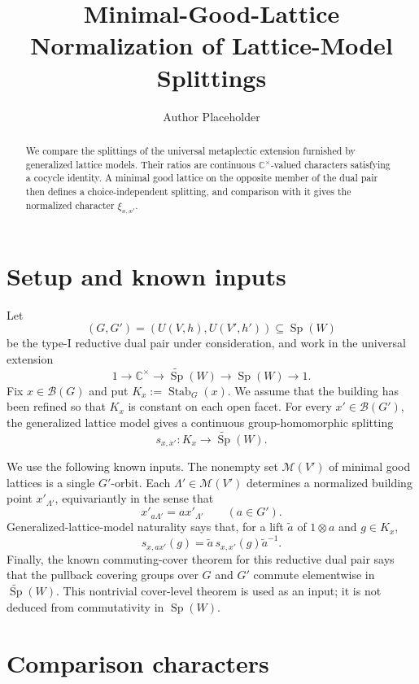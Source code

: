 \documentclass[11pt]{amsart}
\title{Minimal-Good-Lattice Normalization of Lattice-Model Splittings}
\author{Author Placeholder}
\date{}
\DeclareMathOperator{\Sp}{Sp}
\DeclareMathOperator{\Stab}{Stab}
\theoremstyle{remark}
\begin{document}
\begin{abstract}
We compare the splittings of the universal metaplectic extension furnished by
generalized lattice models. Their ratios are continuous
$\mathbb C^\times$-valued characters satisfying a cocycle identity. A minimal
good lattice on the opposite member of the dual pair then defines a
choice-independent splitting, and comparison with it gives the normalized
character $\xi_{x,x'}$.
\end{abstract}

\maketitle

\section{Setup and known inputs}

Let
\[
(G,G')=(U(V,h),U(V',h'))\subseteq \Sp(W)
\]
be the type-I reductive dual pair under consideration, and work in the
universal extension
\[
1\longrightarrow \mathbb C^\times
\longrightarrow \widetilde{\Sp}(W)
\longrightarrow \Sp(W)
\longrightarrow 1.
\]
Fix $x\in\mathcal B(G)$ and put $K_x:=\Stab_G(x)$. We assume that the
building has been refined so that $K_x$ is constant on each open facet. For
every $x'\in\mathcal B(G')$, the generalized lattice model gives a continuous
group-homomorphic splitting
\[
s_{x,x'}\colon K_x\longrightarrow\widetilde{\Sp}(W).
\]

We use the following known inputs. The nonempty set $\mathscr M(V')$ of
minimal good lattices is a single $G'$-orbit. Each
$\Lambda'\in\mathscr M(V')$ determines a normalized building point
$x'_{\Lambda'}$, equivariantly in the sense that
\[
x'_{a\Lambda'}=a x'_{\Lambda'}\qquad(a\in G').
\]
Generalized-lattice-model naturality says that, for a lift $\widetilde a$ of
$1\otimes a$ and $g\in K_x$,
\begin{equation}
s_{x,ax'}(g)=\widetilde a\,s_{x,x'}(g)\widetilde a^{-1}.
\label{eq:naturality}
\end{equation}
Finally, the known commuting-cover theorem for this reductive dual pair says
that the pullback covering groups over $G$ and $G'$ commute elementwise in
$\widetilde{\Sp}(W)$. This nontrivial cover-level theorem is used as an input;
it is not deduced from commutativity in $\Sp(W)$.

\section{Comparison characters}
\end{document}

